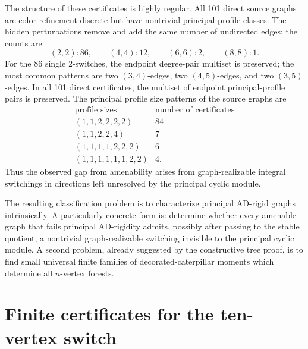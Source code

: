 \documentclass[a4paper,fleqn]{cas-sc}
\theoremstyle{definition}
\theoremstyle{remark}
\begin{document}
The structure of these certificates is highly regular.  All 101 direct source
graphs are color-refinement discrete but have nontrivial principal profile
classes.  The hidden perturbations remove and add the same number of undirected
edges; the counts are
\[
        (2,2):86,\qquad (4,4):12,
        \qquad (6,6):2,
        \qquad (8,8):1.
\]
For the 86 single $2$-switches, the endpoint degree-pair multiset is preserved;
the most common patterns are two $(3,4)$-edges, two $(4,5)$-edges, and two
$(3,5)$-edges.  In all 101 direct certificates, the multiset of endpoint
principal-profile pairs is preserved.  The principal profile size patterns of
the source graphs are
\[
\begin{array}{c|c}
\text{profile sizes} & \text{number of certificates}\\ \hline
(1,1,2,2,2,2) & 84\\
(1,1,2,2,4) & 7\\
(1,1,1,1,2,2,2) & 6\\
(1,1,1,1,1,1,2,2) & 4.
\end{array}
\]
Thus the observed gap from amenability arises from graph-realizable integral
switchings in directions left unresolved by the principal cyclic module.

The resulting classification problem is to characterize principal AD-rigid graphs
intrinsically.  A particularly concrete form is: determine whether every amenable
graph that fails principal AD-rigidity admits, possibly after passing to the
stable quotient, a nontrivial graph-realizable switching invisible to the
principal cyclic module.  A second problem, already suggested by the constructive
tree proof, is to find small universal finite families of decorated-caterpillar
moments which determine all $n$-vertex forests.



\appendix

\section{Finite certificates for the ten-vertex switch}
\label{app:n10-certificate}
\end{document}

